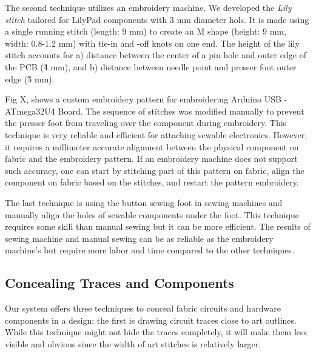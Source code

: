 \documentclass[header.tex]{subfiles}
\begin{document}

The second technique utilizes an embroidery machine. We developed the \textit{Lily stitch} tailored for LilyPad components with 3 mm diameter hols. It is made using a single running stitch (length: 9 mm) to create an M shape (height: 9 mm, width: 0.8-1.2 mm) with tie-in and -off knots on one end. 
The height of the lily stitch accounts for a) distance between the center of a pin hole and outer edge of the PCB (\~ 4 mm), and b) distance between needle point and presser foot outer edge (\~5 mm). 

Fig X, shows a custom embroidery pattern for embroidering Arduino USB - ATmega32U4 Board. The sequence of stitches was modified manually to prevent the presser foot from traveling over the component during embroidery. This technique is very reliable and efficient for attaching sewable electronics. However, it requires a millimeter accurate alignment between the physical component on fabric and the embroidery pattern. If an embroidery machine does not support such accuracy, one can start by stitching part of this pattern on fabric, align the component on fabric based on the stitches, and restart the pattern embroidery.

The last technique is using the button sewing foot in sewing machines and manually align the holes of sewable components under the foot. This technique requires some skill than manual sewing but it can be more efficient. 
The results of sewing machine and manual sewing can be as  reliable as the embroidery machine's but require more labor and time compared to the other techniques.  

\subsection{Concealing Traces and Components}
Our system offers three techniques to conceal fabric circuits and hardware components in a design: the first is drawing circuit traces close to art outlines. 
While this technique might not hide the traces completely, it will make them less visible and obvious since the width of art stitches is relatively larger.
\end{document}

